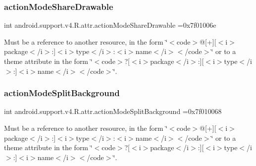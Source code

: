 \subsubsection{\texorpdfstring{action\+Mode\+Share\+Drawable}{actionModeShareDrawable}}
{\footnotesize\ttfamily int android.\+support.\+v4.\+R.\+attr.\+action\+Mode\+Share\+Drawable =0x7f01006e\hspace{0.3cm}{\ttfamily [static]}}

Must be a reference to another resource, in the form \char`\"{}$<$code$>$@\mbox{[}+\mbox{]}\mbox{[}$<$i$>$package$<$/i$>$\+:\mbox{]}$<$i$>$type$<$/i$>$\+:$<$i$>$name$<$/i$>$$<$/code$>$\char`\"{} or to a theme attribute in the form \char`\"{}$<$code$>$?\mbox{[}$<$i$>$package$<$/i$>$\+:\mbox{]}\mbox{[}$<$i$>$type$<$/i$>$\+:\mbox{]}$<$i$>$name$<$/i$>$$<$/code$>$\char`\"{}. \mbox{\label{classandroid_1_1support_1_1v4_1_1R_1_1attr_af329d9724510b9158c62da58f2adf444}} 
\subsubsection{\texorpdfstring{action\+Mode\+Split\+Background}{actionModeSplitBackground}}
{\footnotesize\ttfamily int android.\+support.\+v4.\+R.\+attr.\+action\+Mode\+Split\+Background =0x7f010068\hspace{0.3cm}{\ttfamily [static]}}

Must be a reference to another resource, in the form \char`\"{}$<$code$>$@\mbox{[}+\mbox{]}\mbox{[}$<$i$>$package$<$/i$>$\+:\mbox{]}$<$i$>$type$<$/i$>$\+:$<$i$>$name$<$/i$>$$<$/code$>$\char`\"{} or to a theme attribute in the form \char`\"{}$<$code$>$?\mbox{[}$<$i$>$package$<$/i$>$\+:\mbox{]}\mbox{[}$<$i$>$type$<$/i$>$\+:\mbox{]}$<$i$>$name$<$/i$>$$<$/code$>$\char`\"{}. \mbox{\label{classandroid_1_1support_1_1v4_1_1R_1_1attr_a718477cf455efe9593ccf7d102a1eeb6}} 
